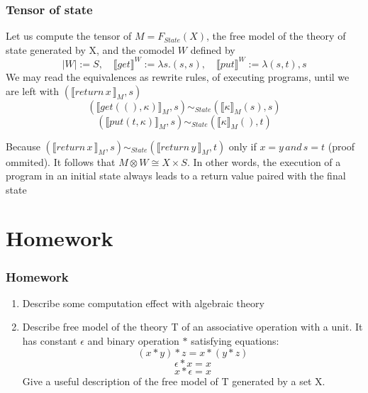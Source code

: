 \documentclass{beamer}
\begin{document}
\begin{frame}
    \frametitle{Tensor of state}
    Let us compute the tensor of $M = F_{State}(X)$, the free model of the theory of state generated by X, and the comodel 
    $W$  defined by 
    \[
      |W| := S, \quad \llbracket get \rrbracket^W := \lambda s. (s, s), \quad   \llbracket put \rrbracket^W := \lambda (s, t), s
    \]
    We may read the equivalences as rewrite rules, of executing programs, until we are left with $(\llbracket return \, x \, \rrbracket_M, s)$
    \[
      (\llbracket get((), \kappa)\rrbracket_M , s) \sim_{State} ( \llbracket \kappa \rrbracket_M (s), s)
    \]
    \[ 
        (\llbracket put(t, \kappa)\rrbracket_M , s) \sim_{State} ( \llbracket \kappa \rrbracket_M (), t)  
    \]

   Because $(\llbracket return \, x \, \rrbracket_M, s) \sim_{State} 
   (\llbracket return \, y \, \rrbracket_M, t)$ only if $x = y \, and \, s = t$ (proof ommited). 
   It follows that $M \otimes W \cong X \times S$.  In other words, the execution of a program in an initial
   state always leads to a return value paired with the final state

    

\end{frame}



\section{Homework}
\begin{frame}
    \frametitle{Homework}
    \begin{enumerate}
        \item Describe some computation effect with algebraic theory
        \item Describe free model of the theory T of an associative operation with a unit.
            It has constant $\epsilon$ and binary operation $*$ satisfying equations:
            \[
                (x * y) * z = x * (y * z)
            \]
            \[
                \epsilon * x = x
            \]
            \[
              x * \epsilon = x   
            \]
            Give a useful description of the free model of T generated by a set X. 
        
    \end{enumerate}
    
    

\end{frame}
\end{document}
